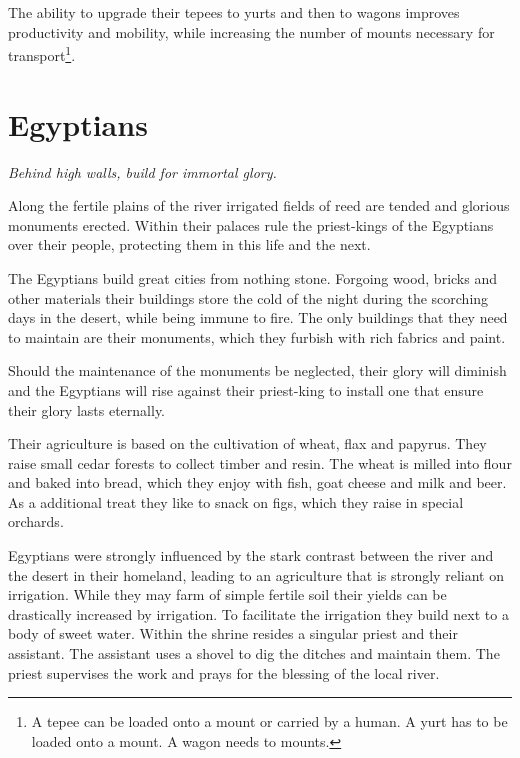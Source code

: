 \documentclass[a4paper]{book}
\begin{document}
The ability to upgrade their tepees to yurts and then to wagons improves
productivity and mobility, while increasing the number of mounts necessary for
transport\footnote{ A tepee can be loaded onto a mount or carried by a human. A
	yurt has to be loaded onto a mount. A wagon needs to mounts. }.

\section{\Gls{Egyptians}}

\begin{flushright}
	\emph{Behind high walls, build for immortal glory.}
\end{flushright}

Along the fertile plains of the river irrigated fields of reed are tended and
glorious monuments erected. Within their palaces rule the priest-kings of the
\gls{Egyptians} over their people, protecting them in this life and the next.

The \gls{Egyptians} build great cities from nothing stone. Forgoing wood,
bricks and other materials their buildings store the cold of the night during
the scorching days in the desert, while being immune to fire. The only
buildings that they need to maintain are their monuments, which they furbish
with rich fabrics and paint.

Should the maintenance of the monuments be neglected, their glory will diminish
and the \gls{Egyptians} will rise against their priest-king to install one that
ensure their glory lasts eternally.

Their agriculture is based on the cultivation of wheat, flax and papyrus. They
raise small cedar forests to collect timber and resin. The wheat is milled into
flour and baked into bread, which they enjoy with fish, goat cheese and milk
and beer. As a additional treat they like to snack on figs, which they raise in
special orchards.

\Gls{Egyptians} were strongly influenced by the stark contrast between
the river and the desert in their homeland,
leading to an agriculture that is strongly reliant on irrigation.
While they may farm of simple fertile soil their yields can be drastically
increased by irrigation.
To facilitate the irrigation they build  next to a body of sweet water.
Within the shrine resides a singular priest and their assistant.
The assistant uses a shovel to dig the ditches and maintain them.
The priest supervises the work and prays for the blessing of the local river.
\end{document}
